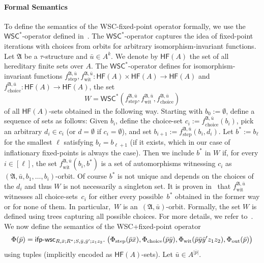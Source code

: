 \documentclass[]{lmcs}
\newcommand{\qspace}{\mathchoice{\;}{\,}{}{}}
\newcommand{\formA}{\Phi}
\newcommand{\tup}[1]{\bar{#1}}
\newcommand{\Struct}{\mathfrak{A}}
\newcommand{\StructV}{A}
\newcommand{\vertA}{u}
\newcommand{\StructA}{\mathfrak{A}}
\newcommand{\StructVA}{A}
\newcommand{\HFsym}{\mathsf{HF}}
\newcommand{\HF}[1]{\HFsym(#1)}
\newcommand{\sig}{\tau}
\newcommand{\formOut}{\formA_{\text{out}}}
\newcommand{\formStep}{\formA_{\text{step}}}
\newcommand{\formChoice}{\formA_{\text{choice}}}
\newcommand{\formWit}{\formA_{\text{wit}}}
\newcommand{\ifpwscSym}{\mathsf{ifp}\text{-}\mathsf{wsc}}
\newcommand{\ifpwscbig}[8]{\ifpwscSym_{#1; #2; #3; #4}.\qspace\big(#5,#6,#7, #8\big)}
\newcommand{\stepF}[0]{f_{\text{step}}}
\newcommand{\choiceF}[0]{f_{\text{choice}}}
\newcommand{\autF}[0]{f_{\text{wit}}}
\newcommand{\wscStarSym}{\mathsf{WSC}^*}
\newcommand{\wsc}[3]{\wscStarSym(#1,#2,#3)}
\begin{document}
\paragraph{Formal Semantics}
To define the semantics of the WSC-fixed-point operator formally,
we use the $\wscStarSym$-operator defined in~\cite{LichterSchweitzer24}.
The $\wscStarSym$-operator captures the idea of fixed-point iterations with choices from orbits for arbitrary isomorphism-invariant functions.
Let $\StructA$ be a $\sig$-structure and $\tup{\vertA} \in \StructVA^k$.
We denote by $\HF{\StructVA}$ the set of all hereditary finite sets over $\StructVA$.
The $\wscStarSym$\nobreakdash-operator defines for isomorphism-invariant functions
${\stepF^{\Struct, \tup{\vertA}},\autF^{\StructA, \tup{\vertA}} \colon \HF{\StructVA} \times \HF{\StructVA} \to \HF{\StructVA}}$ 
and $\choiceF^{\StructA, \tup{\vertA}} \colon \HF{\StructVA} \to \HF{\StructVA}$,
the set
\[W=\wsc{\stepF^{\Struct, \tup{\vertA}}}{\autF^{\StructA, \tup{\vertA}}}{\choiceF^{\StructA, \tup{\vertA}}}\]
of all $\HF{\StructVA}$-sets obtained in the following way.
Starting with $b_0 := \emptyset$,
define a sequence of sets as follows:
Given $b_i$,
define the choice-set $c_i := \choiceF^{\StructA, \tup{\vertA}}(b_i)$,
pick an arbitrary $d_i \in c_i$ (or $d=\emptyset$ if $c_i = \emptyset$),
and set 
$b_{i+1} := \stepF^{\StructA, \tup{\vertA}}(b_i, d_i)$.
Let $b^* := b_\ell$ for the smallest
$\ell$ satisfying $b_\ell = b_{\ell+1}$ (if it exists, which in our case of inflationary fixed-points is always the case).
Then we include $b^*$ in $W$ if, for every $i \in [\ell]$,
the set $\autF^{\StructA, \tup{\vertA}}(b_i, b^*)$
is a set of automorphisms
witnessing $c_i$ as $(\StructA, \tup{\vertA}, b_1, \dots, b_i)$-orbit.
Of course $b^*$ is not unique and depends on the choices of the $d_i$
and thus $W$ is not necessarily  a singleton set.
It is proven in~\cite{LichterSchweitzer24}
that $\autF^{\StructA, \tup{\vertA}}$
witnesses all choice-sets~$c_i$ 
for either every possible~$b^*$ obtained in the former way
or for none of them.
In particular,~$W$ is an $(\StructA, \tup{\vertA})$-orbit.
Formally, the set $W$ is defined using trees capturing all possible choices.
For more details, we refer to~\cite{LichterSchweitzer24}.
We now define the semantics of the WSC+fixed-point operator
\[\formA(\tup{p}) = \ifpwscbig{R,\tup{x}}{R^*}{S,\tup{y}, \tup{y}'}{z_1z_2}{\formStep(\tup{p}\tup{x})}{\formChoice(\tup{p}\tup{y})}{\formWit(\tup{p}\tup{y}\tup{y}'z_1z_2)}{\formOut(\tup{p})}\]
using tuples (implicitly encoded as $\HF{\StructV}$-sets).
Let $\tup{\vertA} \in \StructVA^{|\tup{p}|}$.
\end{document}
